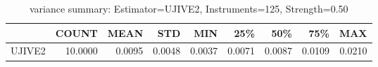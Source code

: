 \begin{table}[ht]
\centering
\caption{variance summary: Estimator=UJIVE2, Instruments=125, Strength=0.50}
\begin{tabular}{lrrrrrrrr}
\toprule
 & COUNT & MEAN & STD & MIN & 25\% & 50\% & 75\% & MAX \\
\midrule
UJIVE2 & 10.0000 & 0.0095 & 0.0048 & 0.0037 & 0.0071 & 0.0087 & 0.0109 & 0.0210 \\
\bottomrule
\end{tabular}
\end{table}
